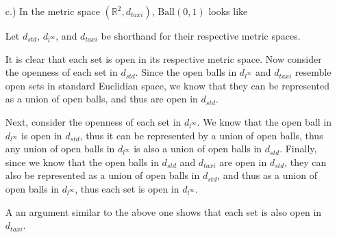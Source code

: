 \documentclass[12pt]{article}
\newcommand{\R}{\mathbb{R}}
\begin{document}
\begin{itemize}
\begin{center}
    \end{center}

    \pagebreak
    \item [c.)] In the metric space $(\R^2,d_{taxi})$, $\text{Ball}(0,1)$ looks like

    \begin{center}
    \end{center}
    
Let $d_{std}$, $d_{l^\infty}$, and $d_{taxi}$ be shorthand for their respective metric spaces.

It is clear that each set is open in its respective metric space. Now consider the openness of each set in $d_{std}$. Since the open balls in $d_{l^\infty}$ and $d_{taxi}$ resemble open sets in standard Euclidian space, we know that they can be represented as a union of open balls, and thus are open in $d_{std}$.

Next, consider the openness of each set in $d_{l^\infty}$. We know that the open ball in $d_{l^\infty}$ is open in $d_{std}$, thus it can be represented by a union of open balls, thus any union of open balls in $d_{l^\infty}$ is also a union of open balls in $d_{std}$. Finally, since we know that the open balls in $d_{std}$ and $d_{taxi}$ are open in $d_{std}$, they can also be represented as a union of open balls in $d_{std}$, and thus as a union of open balls in $d_{l^\infty}$, thus each set is open in $d_{l^\infty}$.

A an argument similar to the above one shows that each set is also open in $d_{taxi}$.
    
\end{itemize}
\end{document}
